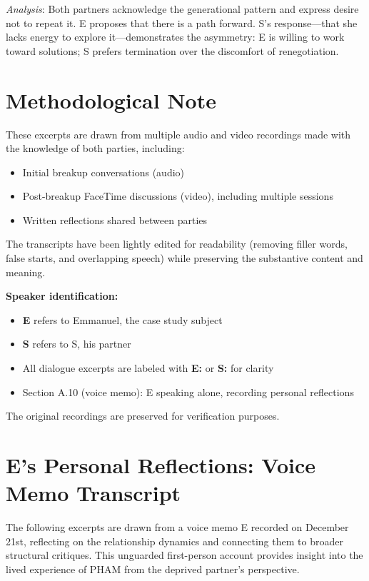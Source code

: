 \documentclass[12pt,openany]{book}
\numberwithin{equation}{chapter}
\begin{document}
\textit{Analysis}: Both partners acknowledge the generational pattern and express desire not to repeat it. E proposes that there is a path forward. S's response---that she lacks energy to explore it---demonstrates the asymmetry: E is willing to work toward solutions; S prefers termination over the discomfort of renegotiation.

\section{Methodological Note}

These excerpts are drawn from multiple audio and video recordings made with the knowledge of both parties, including:
\begin{itemize}
    \item Initial breakup conversations (audio)
    \item Post-breakup FaceTime discussions (video), including multiple sessions
    \item Written reflections shared between parties
\end{itemize}

The transcripts have been lightly edited for readability (removing filler words, false starts, and overlapping speech) while preserving the substantive content and meaning. 

\textbf{Speaker identification:}
\begin{itemize}
    \item \textbf{E} refers to Emmanuel, the case study subject
    \item \textbf{S} refers to S, his partner
    \item All dialogue excerpts are labeled with \textbf{E:} or \textbf{S:} for clarity
    \item Section A.10 (voice memo): E speaking alone, recording personal reflections
\end{itemize}

The original recordings are preserved for verification purposes.

\section{E's Personal Reflections: Voice Memo Transcript}

The following excerpts are drawn from a voice memo E recorded on December 21st, reflecting on the relationship dynamics and connecting them to broader structural critiques. This unguarded first-person account provides insight into the lived experience of PHAM from the deprived partner's perspective.
\end{document}
